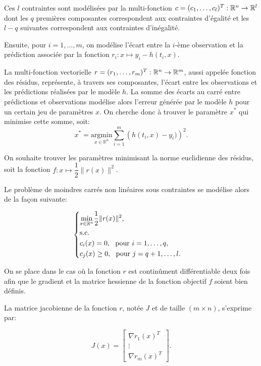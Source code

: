 Ces $l$ contraintes sont modélisées par la multi-fonction $c = (c_{1}, \ldots, c_{l})^{T}: \mathbb{R}^{n} \to \mathbb{R}^{l}$ dont les $q$ premières composantes correspondent 
aux contraintes d'égalité et les $l-q$ suivantes correspondent aux contraintes d'inégalité.

Ensuite, pour $i=1,\ldots,m$, on modélise l'écart entre la $i$-ème observation et la prédiction associée par la fonction $r_{i}: x \mapsto y_{i} - h(t_{i},x)$.

La multi-fonction vectorielle $r =(r_{1}, \ldots,r_{m})^{T}: \mathbb{R}^{n} \to \mathbb{R}^{m}$, aussi appelée fonction des résidus, représente, à travers ses 
composantes, l'écart entre les observations et les prédictions réalisées par le modèle $h$. La somme des écarts au carré entre prédictions et observations 
modélise alors l'erreur générée par le modèle $h$ pour un certain jeu de paramètres $x$. On cherche donc à trouver le paramètre $x^{*}$ qui minimise cette somme, 
soit:
\[
x^* = \underset{x \in \mathbb{R}^{n}}{\text{argmin}} \sum_{i=1}^{m} \left(h(t_{i},x)-y_{i})\right)^{2}.
\]

On souhaite trouver les paramètres minimisant la norme euclidienne des résidus, soit la fonction $f:x\mapsto \dfrac{1}{2}\|r(x)\|^{2}$.


Le problème de moindres carrés non linéaires sous contraintes se modélise alors de la fa\c con suivante:

\begin{equation} \label{pb_general}
  \left\{ \begin{aligned}
    &\underset{x \in \mathbb{R}^n}{\min} \dfrac{1}{2}\|r(x)\|^2, & \\ 
    &\textnormal{s.c.}&  \\
    &c_{i}(x) = 0,\ \textnormal{ pour } i=1,\ldots,q, \\
    &c_{j}(x) \geq 0,\ \textnormal{ pour } j=q+1,\ldots,l.
  \end{aligned} \right. 
\end{equation}

On se place dans le cas où la fonction $r$ est continûment différentiable deux fois afin que le gradient et la matrice hessienne de la fonction objectif $f$ soient
bien définis.

La matrice jacobienne de la fonction $r$, notée $J$ et de taille $(m\times n)$, s'exprime par:

\begin{equation}\label{jac_res}
  J(x)  =
  \begin{bmatrix}
    \nabla r_1(x)^T \\
    \vdots \\
    \nabla r_m(x)^T
  \end{bmatrix}.
\end{equation}



